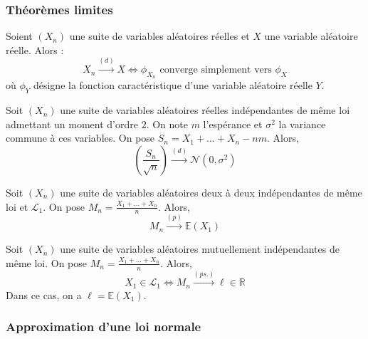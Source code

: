 	\subsubsection{Théorèmes limites}


	\begin{theorem}[Lévy]
		\label{theoreme-central-limite-1}
		Soient $(X_n)$ une suite de variables aléatoires réelles et $X$ une variable aléatoire réelle. Alors :
		\[ X_n \overset{(d)}{\longrightarrow} X \iff \phi_{X_n} \text{ converge simplement vers } \phi_X \]
		où $\phi_Y$ désigne la fonction caractéristique d'une variable aléatoire réelle $Y$.
	\end{theorem}


	\begin{theorem}
		Soit $(X_n)$ une suite de variables aléatoires réelles indépendantes de même loi admettant un moment d'ordre $2$. On note $m$ l'espérance et $\sigma^2$ la variance commune à ces variables. On pose $S_n = X_1 + \dots + X_n - nm$. Alors,
		\[ \left ( \frac{S_n}{\sqrt{n}} \right) \overset{(d)}{\longrightarrow} \mathcal{N}(0, \sigma^2) \]
	\end{theorem}


	\begin{theorem}
		Soit $(X_n)$ une suite de variables aléatoires deux à deux indépendantes de même loi et $\mathcal{L}_1$. On pose $M_n = \frac{X_1 + \dots + X_n}{n}$. Alors,
		\[ M_n \overset{(p)}{\longrightarrow} \mathbb{E}(X_1) \]
	\end{theorem}


	\begin{theorem}
		Soit $(X_n)$ une suite de variables aléatoires mutuellement indépendantes de même loi. On pose $M_n = \frac{X_1 + \dots + X_n}{n}$. Alors,
		\[ X_1 \in \mathcal{L}_1 \iff M_n \overset{(ps.)}{\longrightarrow} \ell \in \mathbb{R} \]
		Dans ce cas, on a $\ell = \mathbb{E}(X_1)$.
	\end{theorem}

	\subsubsection{Approximation d'une loi normale}

